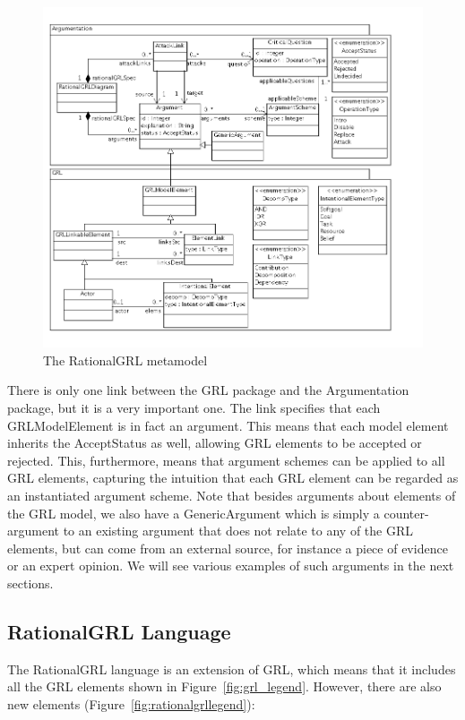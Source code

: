 \begin{figure}[t]
\includegraphics[width=\textwidth]{metamodel/metamodel}
\caption{The RationalGRL metamodel }
\label{fig:metamodel}
\end{figure}

There is only one link between the \textsf{GRL} package and the \textsf{Argumentation} package, but it is a very important one. The link specifies that each \textsf{GRLModelElement} is in fact an argument. This means that each model element inherits the \textsf{AcceptStatus} as well, allowing GRL elements to be accepted or rejected. This, furthermore, means that argument schemes can be applied to all GRL elements, capturing the intuition that each GRL element can be regarded as an instantiated argument scheme. Note that besides arguments about elements of the GRL model, we also have a \textsf{GenericArgument} which is simply a counter-argument to an existing argument that does not relate to any of the GRL elements, but can come from an external source, for instance a piece of evidence or an expert opinion. We will see various examples of such arguments in the next sections.


\iffalse%
\subsection{RationalGRL Language}
The RationalGRL language is an extension of GRL, which means that it includes all the GRL elements shown in Figure~\ref{fig:grl_legend}. However, there are also new elements (Figure~\ref{fig:rationalgrllegend}):

